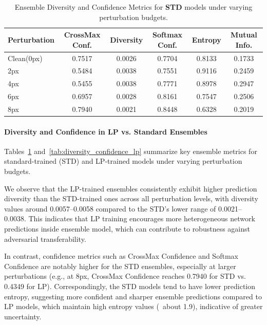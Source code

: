 \vspace{1em}

\begin{table}[htbp]
\centering
\small
\caption{Ensemble Diversity and Confidence Metrics for \textbf{STD} models under varying perturbation budgets.}
\label{tab:diversity_confidence_std}
\begin{tabular}{lccccc}
\toprule
\textbf{Perturbation} & \textbf{CrossMax Conf.} & \textbf{Diversity} & \textbf{Softmax Conf.} & \textbf{Entropy} & \textbf{Mutual Info.} \\
\midrule
Clean(0px)   & 0.7517 & 0.0026 & 0.7704 & 0.8133 & 0.1733 \\
2px   & 0.5484 & 0.0038 & 0.7551 & 0.9116 & 0.2459 \\
4px   & 0.5455 & 0.0038 & 0.7771 & 0.8978 & 0.2947 \\
6px   & 0.6957 & 0.0028 & 0.8161 & 0.7547 & 0.2506 \\
8px   & 0.7940 & 0.0021 & 0.8448 & 0.6328 & 0.2019 \\
\bottomrule
\end{tabular}
\end{table}






\paragraph{Diversity and Confidence in LP vs. Standard Ensembles}

Tables~\ref{tab:diversity_confidence_std} and~\ref{tab:diversity_confidence_lp} summarize key ensemble metrics for standard-trained (STD) and LP-trained models under varying perturbation budgets. 

We observe that the LP-trained ensembles consistently exhibit higher prediction diversity than the STD-trained ones across all perturbation levels, with diversity values around 0.0057–0.0058 compared to the STD’s lower range of 0.0021–0.0038. This indicates that LP training encourages more heterogeneous network predictions inside ensemble model, which can contribute to robustness against adversarial transferability.

In contrast, confidence metrics such as CrossMax Confidence and Softmax Confidence are notably higher for the STD ensembles, especially at larger perturbations (e.g., at 8px, CrossMax Confidence reaches 0.7940 for STD vs. 0.4349 for LP). Correspondingly, the STD models tend to have lower prediction entropy, suggesting more confident and sharper ensemble predictions compared to LP models, which maintain high entropy values (~about 1.9), indicative of greater uncertainty.

